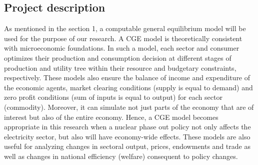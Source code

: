 \documentclass[10pt,a4paper]{article}
\begin{document}
\begin{comment}
Nuclear safety and waste disposal.: Number of people surrounding nuclear power plant at 30 km radius.
Current political situation regarding nuclear phase out in Sweden: What current government says and what its opposition parties says
To represent the government plan,
To represent the opposition parties plan,
Potential role of hydropower, renewable and carbon capture and sequestration.
Current energy status of Sweden.
Considering the nuclear power to be phase out, and the possibility of substituting it by relatively in expensive technique of fossil fuel power is excluded due to CO2 commitment and hydropower development is restricted due to its capacity, then the price and supply of electricity will most certainly be affected.

To expand hydroelectric power or to revert to importing oil and gas to substitute for nuclear energy are hardly options for an environmentally conscious state like Sweden. Moreover, replacing nuclear power with renewable energy sources is not currently a realistic option.

The purpose of this research is to examine the effects of different policy scenarios with respect to Swedish energy policy, specifically issues concerning a nuclear phase-out and restrictions on CO2 emissions.

\end{comment}



\subsection{Project description}
As mentioned in the section 1, a computable general equilibrium model will be used for the purpose of our research. A CGE model is theoretically consistent with microeconomic foundations. In such a model, each sector and consumer optimizes their production and consumption decision at different stages of production and utility tree within their resource and budgetary constraints, respectively. These models also ensure the balance of income and expenditure of the economic agents, market clearing conditions (supply is equal to demand) and zero profit conditions (sum of inputs is equal to output) for each sector (commodity). Moreover, it can simulate not just parts of the economy that are of interest but also of the entire economy. Hence, a CGE model becomes appropriate in this research when a nuclear phase out policy not only affects the electricity sector, but also will have economy-wide effects. These models are also useful for analyzing changes in sectoral output, prices, endowments and trade as well as changes in national efficiency (welfare) consequent to policy changes.
\end{document}
